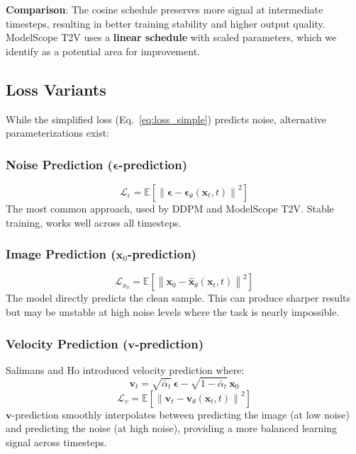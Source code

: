 \documentclass[conference]{IEEEtran}
\begin{document}
\textbf{Comparison}: The cosine schedule preserves more signal at intermediate timesteps, resulting in better training stability and higher output quality. ModelScope T2V uses a \textbf{linear schedule} with scaled parameters, which we identify as a potential area for improvement.

\subsection{Loss Variants}

While the simplified loss (Eq.~\ref{eq:loss_simple}) predicts noise, alternative parameterizations exist:

\subsubsection{Noise Prediction ($\boldsymbol{\epsilon}$-prediction)}
\begin{equation}
    \mathcal{L}_\epsilon = \mathbb{E}\left[\left\| \boldsymbol{\epsilon} - \boldsymbol{\epsilon}_\theta(\mathbf{x}_t, t) \right\|^2\right]
\end{equation}
The most common approach, used by DDPM and ModelScope T2V. Stable training, works well across all timesteps.

\subsubsection{Image Prediction ($\mathbf{x}_0$-prediction)}
\begin{equation}
    \mathcal{L}_{x_0} = \mathbb{E}\left[\left\| \mathbf{x}_0 - \hat{\mathbf{x}}_\theta(\mathbf{x}_t, t) \right\|^2\right]
\end{equation}
The model directly predicts the clean sample. This can produce sharper results but may be unstable at high noise levels where the task is nearly impossible.

\subsubsection{Velocity Prediction ($\mathbf{v}$-prediction)}
Salimans and Ho \cite{salimans2022progressive} introduced velocity prediction where:
\begin{equation}
    \mathbf{v}_t = \sqrt{\bar{\alpha}_t}\,\boldsymbol{\epsilon} - \sqrt{1 - \bar{\alpha}_t}\,\mathbf{x}_0
    \label{eq:velocity}
\end{equation}
\begin{equation}
    \mathcal{L}_v = \mathbb{E}\left[\left\| \mathbf{v}_t - \mathbf{v}_\theta(\mathbf{x}_t, t) \right\|^2\right]
\end{equation}
$\mathbf{v}$-prediction smoothly interpolates between predicting the image (at low noise) and predicting the noise (at high noise), providing a more balanced learning signal across timesteps.
\end{document}
